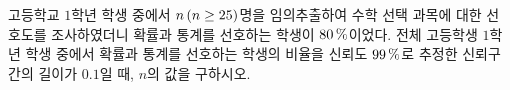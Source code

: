 고등학교 $1$학년 학생 중에서 $n\mkern3mu (n\ge 25)$명을 임의추출하여 수학 선택 과목에 대한 선호도를 조사하였더니 확률과 통계를 선호하는 학생이 $80\mkern3mu \%$이었다. 전체 고등학생 $1$학년 학생 중에서 확률과 통계를 선호하는 학생의 비율을 신뢰도 $99\mkern3mu \%$로 추정한 신뢰구간의 길이가 $0.1$일 때, $n$의 값을 구하시오. 
